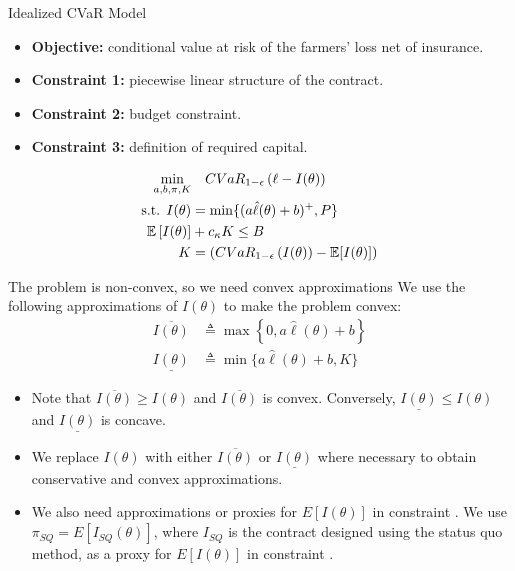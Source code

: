 \documentclass{beamer}
\begin{document}
\begin{frame}{Idealized CVaR Model}
\begin{itemize}
    \item \textbf{Objective:} conditional value at risk of the farmers' loss net of insurance.
    \item  \textbf{Constraint 1:} piecewise linear structure of the contract. 
    \item \textbf{Constraint 2:} budget constraint.
    \item \textbf{Constraint 3:} definition of required capital.
\end{itemize}
 
\begin{align}
        \min_{a,b,\pi, K}  & \quad CVaR_{1-\epsilon}\left ( \ell - I(\theta) \right ) \notag\\
        \text{s.t.   }I(\theta) &= \min \{ (a\hat{\ell}(\theta) + b)^+,P \} \\
        \mathbb{E}\left [ I(\theta) \right ] &+ c_{\kappa} K \leq B \\
        K &= \left( CVaR_{1-\epsilon}\left ( I(\theta) \right ) - \mathbb{E}[I(\theta)] \right) \label{cons-budget}
    \end{align}
\end{frame}

\begin{frame}{The problem is non-convex, so we need convex approximations}
\label{convex-approx}
We use the following approximations of $I(\theta)$ to make the problem convex: 
\begin{align*}
    \overline{I(\theta)} &\triangleq \max \left \{ 0,a\hat{\ell}(\theta) + b\right \} \\
    \underline{I(\theta)} &\triangleq \min \{ a\hat{\ell}(\theta) + b,K \}
\end{align*}
\begin{itemize}
    \item Note that $\overline{I(\theta)} \geq I(\theta)$ and $\overline{I(\theta)}$ is convex. Conversely, $\underline{I(\theta)} \leq I(\theta)$ and $\underline{I(\theta)}$ is concave. 
    \item We replace $I(\theta)$ with either $\overline{I(\theta)}$ or $\underline{I(\theta)}$ where necessary to obtain conservative and convex approximations. 
    \item We also need approximations or proxies for $E[I(\theta)]$ in constraint . We use $\pi_{SQ} = E[I_{SQ}(\theta)]$, where $I_{SQ}$ is the contract designed using the status quo method, as a proxy for $E[I(\theta)]$ in constraint .
\end{itemize}
\end{frame}
\end{document}
